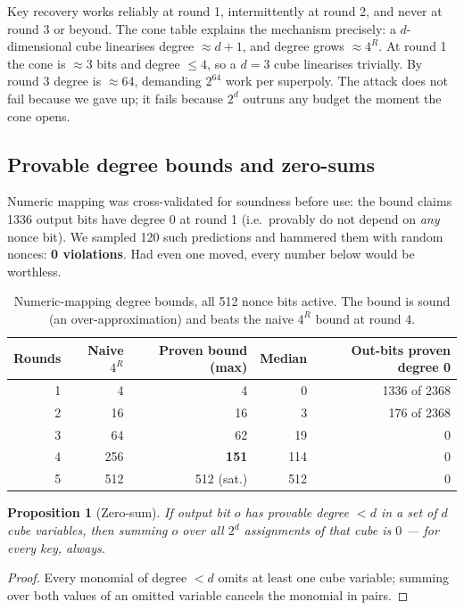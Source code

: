 \documentclass[11pt,a4paper]{article}
\theoremstyle{plain}
\newtheorem{proposition}{Proposition}
\theoremstyle{definition}
\theoremstyle{remark}
\begin{document}
Key recovery works reliably at round 1, intermittently at round 2, and never at round
3 or beyond. The cone table explains the mechanism precisely: a $d$-dimensional cube
linearises degree $\approx d+1$, and degree grows $\approx 4^R$. At round 1 the cone
is $\approx 3$ bits and degree $\le 4$, so a $d=3$ cube linearises trivially. By round
3 degree is $\approx 64$, demanding $2^{64}$ work per superpoly. The attack does not
fail because we gave up; it fails because $2^d$ outruns any budget the moment the cone
opens.

\subsection{Provable degree bounds and zero-sums}

Numeric mapping was cross-validated for soundness before use: the bound claims 1336
output bits have degree 0 at round 1 (i.e.\ provably do not depend on \emph{any} nonce
bit). We sampled 120 such predictions and hammered them with random nonces:
\textbf{0 violations}. Had even one moved, every number below would be worthless.

\begin{table}[h]
\centering
\caption{Numeric-mapping degree bounds, all 512 nonce bits active. The bound is sound
(an over-approximation) and beats the naive $4^R$ bound at round 4.}
\begin{tabular}{rrrrr}
\toprule
Rounds & Naive $4^R$ & Proven bound (max) & Median & Out-bits proven degree 0 \\
\midrule
1 & 4   & 4   & 0   & 1336 of 2368 \\
2 & 16  & 16  & 3   & 176 of 2368 \\
3 & 64  & 62  & 19  & 0 \\
4 & 256 & \textbf{151} & 114 & 0 \\
5 & 512 & 512 (sat.) & 512 & 0 \\
\bottomrule
\end{tabular}
\end{table}

\begin{proposition}[Zero-sum]
If output bit $o$ has provable degree $< d$ in a set of $d$ cube variables, then
summing $o$ over all $2^d$ assignments of that cube is $0$ --- for every key, always.
\end{proposition}
\begin{proof}
Every monomial of degree $< d$ omits at least one cube variable; summing over both
values of an omitted variable cancels the monomial in pairs.
\end{proof}
\end{document}
